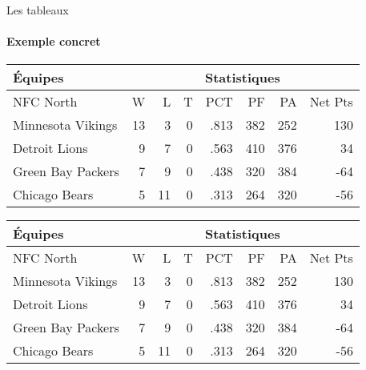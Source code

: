 \begin{frame}[fragile,c]{Les tableaux}
	\framesubtitle{Exemple concret}
\begin{codesource}
	\begin{tabularx}{\textwidth}{X|rrr|r|rrr}
		\textbf{\'{E}quipes}	&	\multicolumn{7}{c}{\textbf{Statistiques}} \\
		\hline\hline
		NFC North			&	W	&	L	&	T	&	PCT		&	PF	&	PA	&	Net Pts \\
		\hline
		Minnesota Vikings	&	13	&	3	&	0	&	.813	&	382	&	252	&	130 \\
		Detroit Lions		&	9	&	7	&	0	&	.563	&	410	&	376	&	34 \\
		Green Bay Packers	&	7	&	9	& 	0	&	.438	&	320	&	384	&	-64 \\
		Chicago Bears		&	5	&	11	&	0	&	.313	&	264	&	320	&	-56
	\end{tabularx}
\end{codesource}

	\begin{tabularx}{\textwidth}{X|rrr|r|rrr}
		\textbf{Équipes}	&	\multicolumn{7}{c}{\textbf{Statistiques}} \\
		\hline\hline
		NFC North			&	W	&	L	&	T	&	PCT		&	PF	&	PA	&	Net Pts \\
		\hline
		Minnesota Vikings	&	13	&	3	&	0	&	.813	&	382	&	252	&	130 \\
		Detroit Lions		&	9	&	7	&	0	&	.563	&	410	&	376	&	34 \\
		Green Bay Packers	&	7	&	9	& 	0	&	.438	&	320	&	384	&	-64 \\
		Chicago Bears		&	5	&	11	&	0	&	.313	&	264	&	320	&	-56
	\end{tabularx}
\end{frame}

